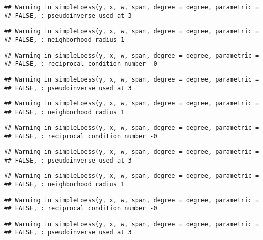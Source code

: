 \documentclass[]{article}
\begin{document}
\begin{verbatim}
## Warning in simpleLoess(y, x, w, span, degree = degree, parametric =
## FALSE, : pseudoinverse used at 3
\end{verbatim}

\begin{verbatim}
## Warning in simpleLoess(y, x, w, span, degree = degree, parametric =
## FALSE, : neighborhood radius 1
\end{verbatim}

\begin{verbatim}
## Warning in simpleLoess(y, x, w, span, degree = degree, parametric =
## FALSE, : reciprocal condition number -0
\end{verbatim}

\begin{verbatim}
## Warning in simpleLoess(y, x, w, span, degree = degree, parametric =
## FALSE, : pseudoinverse used at 3
\end{verbatim}

\begin{verbatim}
## Warning in simpleLoess(y, x, w, span, degree = degree, parametric =
## FALSE, : neighborhood radius 1
\end{verbatim}

\begin{verbatim}
## Warning in simpleLoess(y, x, w, span, degree = degree, parametric =
## FALSE, : reciprocal condition number -0
\end{verbatim}

\begin{verbatim}
## Warning in simpleLoess(y, x, w, span, degree = degree, parametric =
## FALSE, : pseudoinverse used at 3
\end{verbatim}

\begin{verbatim}
## Warning in simpleLoess(y, x, w, span, degree = degree, parametric =
## FALSE, : neighborhood radius 1
\end{verbatim}

\begin{verbatim}
## Warning in simpleLoess(y, x, w, span, degree = degree, parametric =
## FALSE, : reciprocal condition number -0
\end{verbatim}

\begin{verbatim}
## Warning in simpleLoess(y, x, w, span, degree = degree, parametric =
## FALSE, : pseudoinverse used at 3
\end{verbatim}
\end{document}
